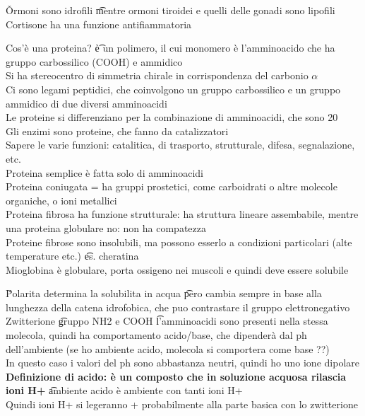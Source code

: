 \documentclass[12pt]{article}
\begin{document}
\v

Ormoni sono idrofili \t mentre ormoni tiroidei e quelli delle gonadi sono lipofili \\
Cortisone ha una funzione antifiammatoria

\s[Proteine]
Cos'è una proteina? \t è un polimero, il cui monomero è l'amminoacido che ha gruppo carbossilico (COOH) e ammidico \\
Si ha stereocentro di simmetria chirale in corrispondenza del carbonio $\alpha$ \\
Ci sono legami peptidici, che coinvolgono un gruppo carbossilico e un gruppo ammidico di due diversi amminoacidi \\
Le proteine si differenziano per la combinazione di amminoacidi, che sono 20 \\
Gli enzimi sono proteine, che fanno da catalizzatori \\
Sapere le varie funzioni: catalitica, di trasporto, strutturale, difesa, segnalazione, etc. \\
Proteina semplice è fatta solo di amminoacidi \\
Proteina coniugata = ha gruppi prostetici, come carboidrati o altre molecole organiche, o ioni metallici \\
Proteina fibrosa ha funzione strutturale: ha struttura lineare assembabile, mentre una proteina globulare no: non ha compatezza \\
Proteine fibrose sono insolubili, ma possono esserlo a condizioni particolari (alte temperature etc.) \t es. cheratina \\
Mioglobina è globulare, porta ossigeno nei muscoli e quindi deve essere solubile

\v

Polarita determina la solubilita in acqua \t pero cambia sempre in base alla lunghezza della catena idrofobica, che puo contrastare il gruppo elettronegativo \\
Zwitterione \t gruppo NH2 e COOH \t l'amminoacidi sono presenti nella stessa molecola, quindi ha comportamento acido/base, che dipenderà dal ph dell'ambiente (se ho ambiente acido, molecola si comportera come base ??) \\
In questo caso i valori del ph sono abbastanza neutri, quindi ho uno ione dipolare \\
\textbf{Definizione di acido: è un composto che in soluzione acquosa rilascia ioni H+} \t ambiente acido è ambiente con tanti ioni H+ \\
Quindi ioni H+ si legeranno + probabilmente alla parte basica con lo zwitterione
\end{document}
